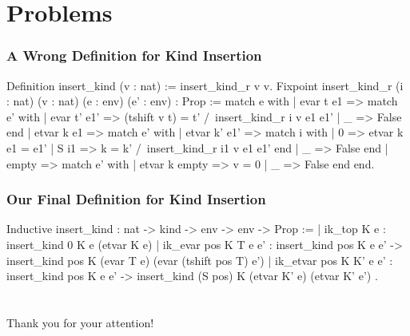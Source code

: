 \documentclass{beamer}
\begin{document}
\section{Problems}

\begin{frame}[fragile]
\frametitle{A Wrong Definition for Kind Insertion}

\begin{pyglist}[fontsize=\scriptsize]
Definition insert_kind (v : nat) := insert_kind_r v v.
Fixpoint insert_kind_r (i : nat) (v : nat) (e : env) (e' : env) : Prop :=
match e with
| evar t e1 => match e' with
               | evar t' e1' =>
                   (tshift v t) = t' /\ insert_kind_r i v e1 e1'
               | _ => False
               end
| etvar k e1 => match e' with
                | etvar k' e1' => match i with
                                  | 0 => etvar k e1 = e1'
                                  | S i1 =>
                                      k = k' /\ insert_kind_r i1 v e1 e1'
                                  end
                | _ => False
                end
  | empty => match e' with
             | etvar k empty => v = 0
             | _ => False
             end
end.
\end{pyglist}

\end{frame}

\begin{frame}[fragile]
\frametitle{Our Final Definition for Kind Insertion}

\begin{pyglist}
Inductive insert_kind : nat -> kind -> env -> env -> Prop :=
| ik_top K e :
    insert_kind 0 K e (etvar K e)
| ik_evar pos K T e e' :
    insert_kind pos K e e' ->
    insert_kind pos K (evar T e) (evar (tshift pos T) e')
| ik_etvar pos K K' e e' :
    insert_kind pos K e e' ->
    insert_kind (S pos) K (etvar K' e) (etvar K' e')
.
\end{pyglist}

\end{frame}

\section*{}

\begin{frame}[fragile]
  \begin{center}
    Thank you for your attention!
  \end{center}
\end{frame}
\end{document}
